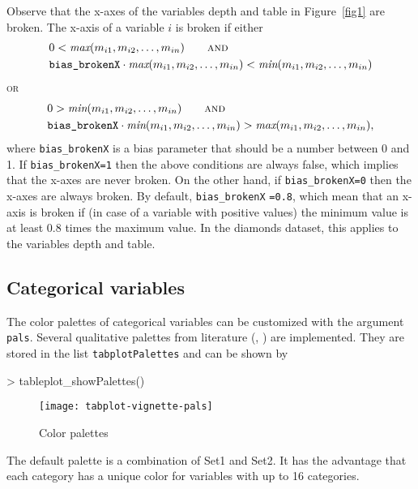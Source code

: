 \documentclass[11pt, fleqn, a4paper]{article}
\begin{document}
Observe that the x-axes of the variables depth and table in Figure~\ref{fig1} are broken. The x-axis of a variable $i$ is broken if
either
\begin{align*}
& 0 < \textit{max}(m_{i1}, m_{i2},\ldots, m_{in}) \qquad \textsc{and}\\
& \mbox{{\tt bias\_brokenX}} \cdot \textit{max}(m_{i1}, m_{i2},\ldots, m_{in}) < \textit{min}(m_{i1}, m_{i2},\ldots, m_{in}) 
\end{align*}
\textsc{or}
\begin{align*}
& 0 > \textit{min}(m_{i1}, m_{i2},\ldots, m_{in}) \qquad \textsc{and}\\
& \mbox{{\tt bias\_brokenX}} \cdot \textit{min}(m_{i1}, m_{i2},\ldots, m_{in}) > \textit{max}(m_{i1}, m_{i2},\ldots, m_{in}),
\end{align*}
where {\tt bias\_brokenX} is a bias parameter that should be a number between 0 and 1. If {\tt bias\_brokenX=1} then the above conditions are always false, which implies that the x-axes are never broken. On the other hand, if {\tt bias\_brokenX=0} then the x-axes are always broken. By default, {\tt bias\_brokenX} {\tt=0.8}, which mean that an x-axis is broken if (in case of a variable with positive values) the minimum value is at least 0.8 times the maximum value. In the diamonds dataset, this applies to the variables depth and table.


\subsection{Categorical variables}
The color palettes of categorical variables can be customized with the argument {\tt pals}. Several qualitative palettes from literature (\cite{brewer}, \cite{??}) are implemented. They are stored in the list {\tt tabplotPalettes} and can be shown by

\begin{Schunk}
\begin{Sinput}
> tableplot_showPalettes()
\end{Sinput}
\end{Schunk}

\begin{figure}[htp]
\begin{center}
\texttt{[image: tabplot-vignette-pals]}
\end{center}
\caption{Color palettes}
\label{fig:pals}
\end{figure}

The default palette is a combination of Set1 and Set2. It has the advantage that each category has a unique color for variables with up to 16 categories.
\end{document}
